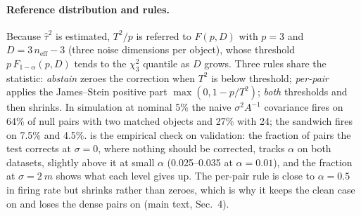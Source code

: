 \paragraph{Reference distribution and rules.}
Because $\hat\tau^2$ is estimated, $T^2/p$ is referred to $F(p,D)$ with $p{=}3$ and $D=3\,n_{\mathrm{eff}}-3$ (three noise dimensions per object), whose threshold $p\,F_{1-\alpha}(p,D)$ tends to the $\chi^2_3$ quantile as $D$ grows. Three rules share the statistic: \emph{abstain} zeroes the correction when $T^2$ is below threshold; \emph{per-pair} applies the James--Stein positive part $\max(0,1-p/T^2)$; \emph{both} thresholds and then shrinks. In simulation at nominal 5\% the naive $\sigma^2A^{-1}$ covariance fires on 64\% of null pairs with two matched objects and 27\% with 24; the sandwich fires on 7.5\% and 4.5\%.  is the empirical check on validation: the fraction of pairs the test corrects at $\sigma{=}0$, where nothing should be corrected, tracks $\alpha$ on both datasets, slightly above it at small $\alpha$ (0.025--0.035 at $\alpha{=}0.01$), and the fraction at $\sigma{=}\SI{2}{m}$ shows what each level gives up. The per-pair rule is close to $\alpha{=}0.5$ in firing rate but shrinks rather than zeroes, which is why it keeps the clean case on \opvv and loses the dense pairs on \vxreal (main text, Sec.~4).

\begin{table}[t]
  \centering\small
  \caption{\textbf{Firing rate of the Wald rule on validation}: fraction of ego--CAV pairs corrected, at $\sigma{=}0$ (the empirical false-fire rate) and at $\sigma{=}\SI{2}{m}$. \vxreal: 975 pairs; \opvv: 1,874 pairs (the 0.1 level was not run there). Sources: \texttt{B\_boxes\_only\_arms\_val\_result.json}, \texttt{abstain\_val\_result.json}.}
  \label{tab:supp_firing}
\end{table}

